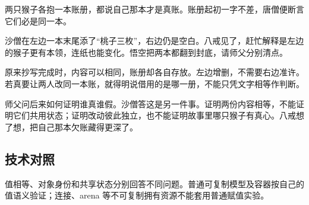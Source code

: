 两只猴子各抱一本账册，都说自己那本才是真账。账册起初一字不差，唐僧便断言它们必是同一本。

沙僧在左边一本末尾添了“桃子三枚”，右边仍是空白。八戒见了，赶忙解释是左边的猴子更有本领，连纸也能变化。悟空把两本都翻到封底，请师父分别清点。

原来抄写完成时，内容可以相同，账册却各自存放。左边增删，不需要右边准许。若真要让两人改同一本账，就得明说借用的是哪一册，不能只凭文字相等作判断。

师父问后来如何证明谁真谁假。沙僧答这是另一件事。证明两份内容相等，不能证明它们共用状态；证明改动彼此独立，也不能证明故事里哪只猴子有真心。八戒想了想，把自己那本欠账藏得更深了。

\subsection*{技术对照}

值相等、对象身份和共享状态分别回答不同问题。普通可复制模型及容器按自己的值语义验证；连接、arena 等不可复制拥有资源不能套用普通赋值实验。
